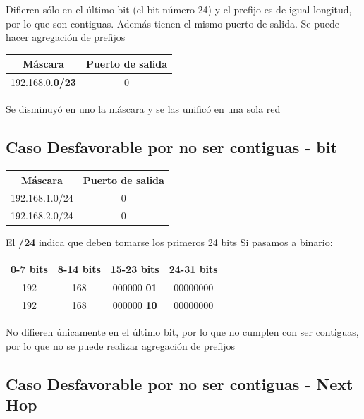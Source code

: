 \documentclass[titlepage,a4paper]{article}
\begin{document}
Difieren sólo en el último bit (el bit número 24) y el prefijo es de igual longitud, por lo que son contiguas. Además tienen el mismo puerto de salida. Se puede hacer agregación de prefijos

\begin{center}
    \begin{tabular}{c|c}
        Máscara & Puerto de salida \\
        \hline
        \hline
         192.168.0.\textbf{0/23} &  0\\
    \end{tabular}
\end{center}

Se disminuyó en uno la máscara y se las unificó en una sola red

\subsection{Caso Desfavorable por no ser contiguas - bit}

\begin{center}
    \begin{tabular}{c|c}
        Máscara & Puerto de salida \\
        \hline
        \hline
         192.168.1.0/24 &  0\\
         \hline
         192.168.2.0/24 &  0
    \end{tabular}
\end{center}

El \textbf{/24} indica que deben tomarse los primeros 24 bits
Si pasamos a binario:

\begin{center}
    \begin{tabular}{c|c|c|c}
        0-7 bits & 8-14 bits & 15-23 bits & 24-31 bits \\
        \hline
        \hline
        192 & 168 & 000000 \textbf{01} & 00000000 \\
        \hline
        192 & 168 & 000000 \textbf{10} & 00000000 \\
    \end{tabular}
\end{center}

No difieren únicamente en el último bit, por lo que no cumplen con ser contiguas, por lo que no se puede realizar agregación de prefijos


\subsection{Caso Desfavorable por no ser contiguas - Next Hop}
\end{document}
